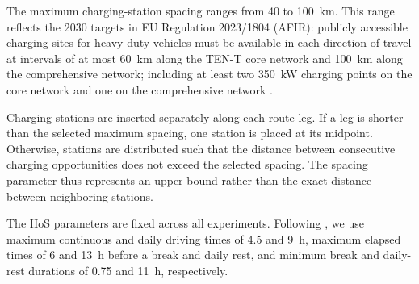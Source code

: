 \documentclass[3p,11pt,authoryear]{elsarticle}  %
\begin{document}
The maximum charging-station spacing ranges from 40 to 100~km. This range reflects the 2030 targets in EU Regulation 2023/1804 (AFIR): publicly accessible charging sites for heavy-duty vehicles must be available in each direction of travel at intervals of at most 60~km along the TEN-T core network and 100~km along the comprehensive network; including at least two 350~kW charging points on the core network and one on the comprehensive network \citep{eu2023afir}.

Charging stations are inserted separately along each route leg. If a leg is shorter than the selected maximum spacing, one station is placed at its midpoint. Otherwise, stations are distributed such that the distance between consecutive charging opportunities does not exceed the selected spacing. The spacing parameter thus represents an upper bound rather than the exact distance between neighboring stations.

The HoS parameters are fixed across all experiments. Following \citet{goel2017exact}, we use maximum continuous and daily driving times of 4.5 and 9~h, maximum elapsed times of 6 and 13~h before a break and daily rest, and minimum break and daily-rest durations of 0.75 and 11~h, respectively. 
\end{document}

